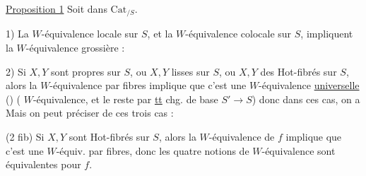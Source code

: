 \uline{Proposition 1}  Soit
dans $\mathrm{Cat}_{/S}$.

1) La $W$-équivalence locale sur $S$, et la $W$-équivalence colocale sur $S$, impliquent la $W$-équivalence grossière :

2) Si $X,Y$ sont propres sur $S$, ou $X,Y$ lisses sur $S$, ou $X,Y$ des Hot-fibrés sur $S$, alors la $W$-équivalence par fibres implique que c'est une $W$-équivalence \uline{universelle} () ( $W$-équivalence, et le reste par \uline{tt} chg. de base $S'\longrightarrow S$) donc dans ces  cas, on a
Mais on peut préciser   de ces trois cas :

\unsure{--}(2 fib) Si $X,Y$ sont Hot-fibrés sur $S$, alors la $W$-équivalence  de $f$ implique que c'est une $W$-équiv. par fibres, donc les quatre notions de $W$-équivalence sont équivalentes pour $f$.
